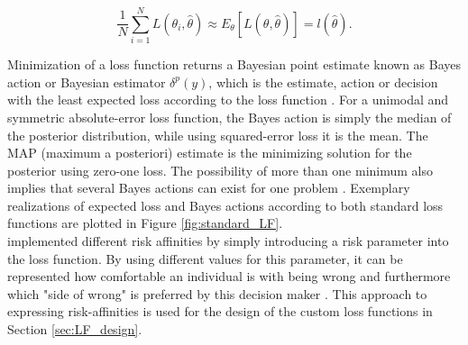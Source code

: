         \begin{equation}\label{eq:ExpectedLoss2}
        \frac{1}{N}\sum_{i=1}^{N} L(\theta_i,\hat{\theta}) \approx E_{\theta}[L(\theta,\hat{\theta})] = l(\hat{\theta}).
        \end{equation}
        
        Minimization of a loss function returns a Bayesian point estimate known as Bayes action or Bayesian estimator $\delta^p(y)$, which is the estimate, action or decision with the least expected loss according to the loss function \citep{berger2013stat, moye2006statistical}. For a unimodal and symmetric absolute-error loss function, the Bayes action is simply the median of the posterior distribution, while using squared-error loss it is the mean. The MAP (maximum a posteriori) estimate is the minimizing solution for the posterior using zero-one loss. The possibility of more than one minimum also implies that several Bayes actions can exist for one problem \citep{davidson2015, berger2013stat}. Exemplary realizations of expected loss and Bayes actions according to both standard loss functions are plotted in Figure \ref{fig:standard_LF}.\\
        \citet{davidson2015} implemented different risk affinities by simply  introducing a risk parameter into the loss function. By using different values for this parameter, it can be represented how comfortable an individual is with being wrong and furthermore which "side of wrong" is preferred by this decision maker \citep{davidson2015}. This approach to expressing risk-affinities is used for the design of the custom loss functions in Section \ref{sec:LF_design}.
        
        
